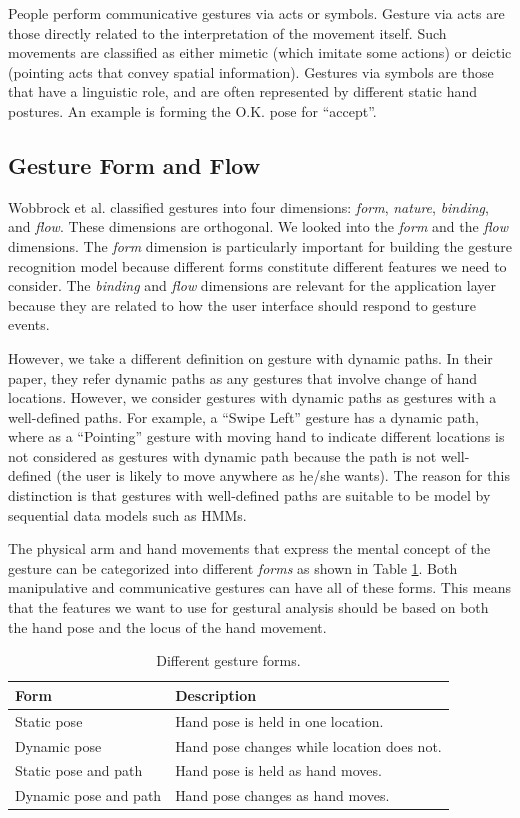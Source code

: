 People perform communicative gestures via acts or symbols. Gesture via acts are
those directly related to the interpretation of the movement itself. Such
movements are classified as either mimetic (which imitate some actions) or
deictic (pointing acts that convey spatial information). Gestures via symbols
are those that have a linguistic role, and are often represented by different static hand postures. An example is forming the
O.K. pose for ``accept''. 

\subsection{Gesture Form and Flow}
Wobbrock et al. \cite{wobbrock09} classified gestures into four dimensions:
\textit{form}, \textit{nature}, \textit{binding}, and \textit{flow}. These
dimensions are orthogonal. We looked into the \textit{form} and the
\textit{flow} dimensions. The \textit{form} dimension is particularly important
for building the gesture recognition model because different forms constitute
different features we need to consider. The \textit{binding} and \textit{flow}
dimensions are relevant for the application layer because they are related to
how the user interface should respond to gesture events.

However, we take a different definition on gesture with dynamic paths. In their
paper, they refer dynamic paths as any gestures that involve change of hand
locations. However, we consider gestures with dynamic paths as gestures with a
well-defined paths. For example, a ``Swipe Left'' gesture has a dynamic path,
where as a ``Pointing'' gesture with moving hand to indicate different locations
is not considered as gestures with dynamic path because the path is not
well-defined (the user is likely to move anywhere as he/she wants). The reason
for this distinction is that gestures with well-defined paths are suitable to be
model by sequential data models such as HMMs.

The physical arm and hand movements that express
the mental concept of the gesture can be categorized into different \textit{forms} \cite{wobbrock09} as shown in Table \ref{tab:form}. Both manipulative and communicative gestures can
have all of these forms. This means that the features we want to use for
gestural analysis should be based on both the hand pose and the locus of the
hand movement.

\begin{table}[h]
  \centering
  \begin{tabular}{| l | l |}
  	\hline
  	\textbf{Form} 		  & \textbf{Description} \\ \hline 
  	Static pose  		  & Hand pose is held in one location. \\ \hline
  	Dynamic pose 		  & Hand pose changes while location does not. \\ \hline
  	Static pose and path  & Hand pose is held as hand moves. \\ \hline
  	Dynamic pose and path & Hand pose changes as hand moves. \\ \hline
  \end{tabular}
  \caption{Different gesture forms.}
  \label{tab:form}
\end{table}

